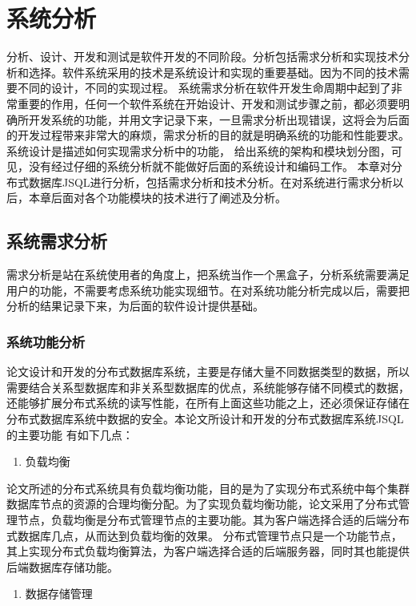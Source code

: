 
\chapter{系统分析}
分析、设计、开发和测试是软件开发的不同阶段。分析包括需求分析和实现技术分析和选择。软件系统采用的技术是系统设计和实现的重要基础。因为不同的技术需要不同的设计，不同的实现过程。
系统需求分析在软件开发生命周期中起到了非常重要的作用，任何一个软件系统在开始设计、开发和测试步骤之前，都必须要明确所开发系统的功能，并用文字记录下来，一旦需求分析出现错误，这将会为后面的开发过程带来非常大的麻烦，需求分析的目的就是明确系统的功能和性能要求。系统设计是描述如何实现需求分析中的功能，
给出系统的架构和模块划分图，可见，没有经过仔细的系统分析就不能做好后面的系统设计和编码工作。
本章对分布式数据库JSQL进行分析，包括需求分析和技术分析。在对系统进行需求分析以后，本章后面对各个功能模块的技术进行了阐述及分析。
\section{系统需求分析}
需求分析是站在系统使用者的角度上，把系统当作一个黑盒子，分析系统需要满足用户的功能，不需要考虑系统功能实现细节。在对系统功能分析完成以后，需要把分析的结果记录下来，为后面的软件设计提供基础。
\subsection{系统功能分析}
论文设计和开发的分布式数据库系统，主要是存储大量不同数据类型的数据，所以需要结合关系型数据库和非关系型数据库的优点，系统能够存储不同模式的数据，还能够扩展分布式系统的读写性能，在所有上面这些功能之上，还必须保证存储在分布式数据库系统中数据的安全。本论文所设计和开发的分布式数据库系统JSQL的主要功能
有如下几点：


	\begin{enumerate}
		\item 负载均衡
	\end{enumerate}


	论文所述的分布式系统具有负载均衡功能，目的是为了实现分布式系统中每个集群数据库节点的资源的合理均衡分配。为了实现负载均衡功能，论文采用了分布式管理节点，负载均衡是分布式管理节点的主要功能。其为客户端选择合适的后端分布式数据库几点，从而达到负载均衡的效果。
	分布式管理节点只是一个功能节点，其上实现分布式负载均衡算法，为客户端选择合适的后端服务器，同时其也能提供后端数据库存储功能。
	
	\begin{enumerate}[resume]
		\item 数据存储管理
	\end{enumerate}


